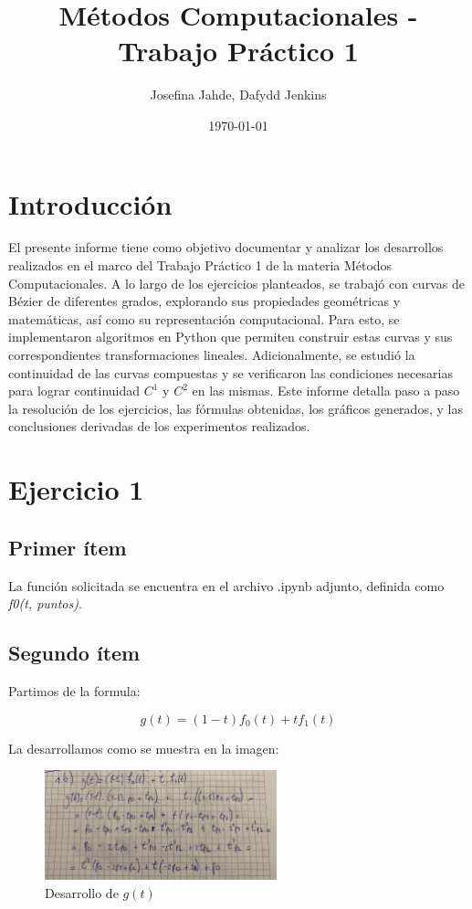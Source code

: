 \documentclass{article}
\title{Métodos Computacionales - Trabajo Práctico 1}
\author{Josefina Jahde, Dafydd Jenkins}
\date{\today}
\begin{document}
\maketitle

\section*{Introducción}
El presente informe tiene como objetivo documentar y analizar los desarrollos realizados en el marco del Trabajo Práctico 1 de la materia Métodos Computacionales. A lo largo de los ejercicios planteados, se trabajó con curvas de Bézier de diferentes grados, explorando sus propiedades geométricas y matemáticas, así como su representación computacional. Para esto, se implementaron algoritmos en Python que permiten construir estas curvas y sus correspondientes transformaciones lineales. Adicionalmente, se estudió la continuidad de las curvas compuestas y se verificaron las condiciones necesarias para lograr continuidad $C^1$ y $C^2$ en las mismas. Este informe detalla paso a paso la resolución de los ejercicios, las fórmulas obtenidas, los gráficos generados, y las conclusiones derivadas de los experimentos realizados.


\section*{Ejercicio 1}
\subsection*{Primer ítem}
La función solicitada se encuentra en el archivo .ipynb adjunto, definida como \textit{f0(t, puntos)}.
\subsection*{Segundo ítem}
Partimos de la formula:

$$
g(t) = (1 - t)f_0(t) + t f_1(t)
$$

La desarrollamos como se muestra en la imagen:

\begin{figure}[H]
    \centering
    \includegraphics[width=0.6\textwidth]{imagenes/1b.jpg}
    \caption{Desarrollo de $g(t)$}
    \label{fig:ejemplo}
\end{figure}
\end{document}
